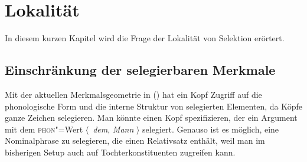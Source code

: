 
\chapter{Lokalität}
\label{Kapitel-Lokalität}


In diesem kurzen Kapitel wird die Frage der Lokalität von Selektion erörtert.

\section{Einschränkung der selegierbaren Merkmale}
\label{sec-synsem}

Mit der aktuellen Merkmalsgeometrie in () hat ein Kopf Zugriff auf die phonologische Form und 
die interne Struktur von selegierten Elementen, da Köpfe ganze Zeichen selegieren.
\ea
\z
\largerpage
Man könnte \zb einen Kopf spezifizieren, der ein Argument mit dem \textsc{phon}"=Wert $\langle$~\emph{dem}, \emph{Mann} $\rangle$ selegiert. Genauso ist es möglich,
eine Nominalphrase zu selegieren, die einen Relativsatz enthält, weil man im
bisherigen Setup auch auf Tochterkonstituenten zugreifen kann.

